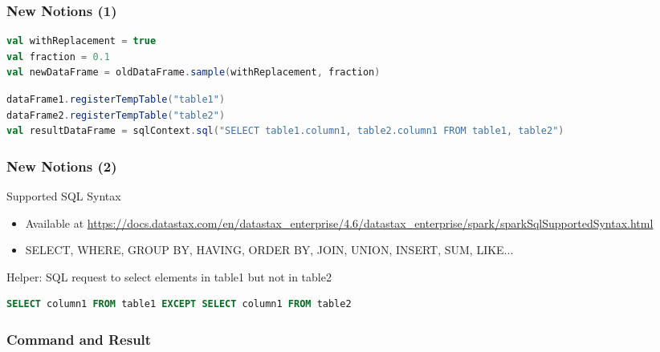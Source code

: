 \documentclass[slidetop,9pt,utf8]{beamer}
\begin{document}
\begin{CJK}{UTF8}{gbsn}
\begin{frame}[fragile]
\end{frame}

\begin{frame}[fragile]
  \frametitle{New Notions (1)}

  \begin{lstlisting}[label=Sampling, caption=Sampling, language=scala, style=code]
val withReplacement = true
val fraction = 0.1
val newDataFrame = oldDataFrame.sample(withReplacement, fraction)
  \end{lstlisting}

  \begin{lstlisting}[label=SQLRequestOnTemporaryTables, caption=SQL Requests on Temporary Tables, language=scala, style=code]
dataFrame1.registerTempTable("table1")
dataFrame2.registerTempTable("table2")
val resultDataFrame = sqlContext.sql("SELECT table1.column1, table2.column1 FROM table1, table2")
  \end{lstlisting}

\end{frame}

\begin{frame}[fragile]
  \frametitle{New Notions (2)}

  \begin{block}{Supported SQL Syntax}
    \begin{itemize}
      \item Available at \tiny\href{http://docs.datastax.com/en/datastax\_enterprise/4.6/datastax\_enterprise/spark/sparkSqlSupportedSyntax.html}{https://docs.datastax.com/en/datastax\_enterprise/4.6/datastax\_enterprise/spark/sparkSqlSupportedSyntax.html}\normalsize
      \item SELECT, WHERE, GROUP BY, HAVING, ORDER BY, JOIN, UNION, INSERT, SUM, LIKE...
    \end{itemize}
  \end{block}

  \begin{block}{Helper: SQL request to select elements in table1 but not in table2}
    \begin{lstlisting}[language=sql]
SELECT column1 FROM table1 EXCEPT SELECT column1 FROM table2
    \end{lstlisting}
  \end{block}

\end{frame}

\begin{frame}[fragile]
  \frametitle{Command and Result}


\end{frame}
\end{CJK}
\end{document}

